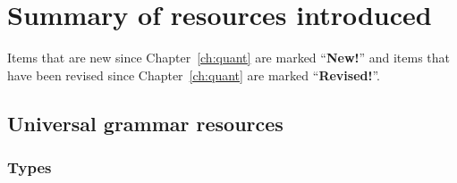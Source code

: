    
               
      


   
\section{Summary of resources introduced}
\label{sec:sumresch8}




Items that are new since Chapter~\ref{ch:quant} are marked
``\textbf{New!}'' and items that have been revised since
Chapter~\ref{ch:quant} are marked ``\textbf{Revised!}''.  %

\subsection{Universal grammar resources} 

\subsubsection{Types} 


